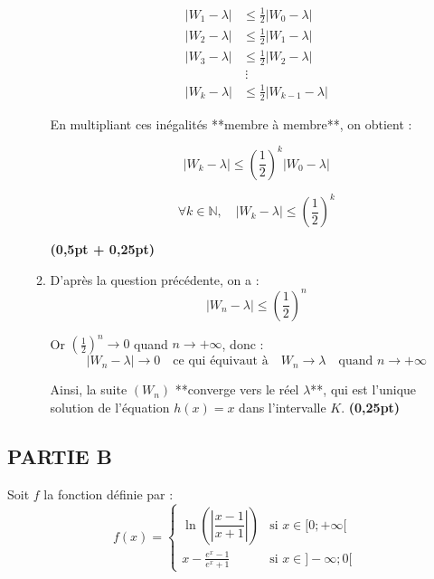 \documentclass[12pt,a4paper]{article}
\begin{document}
\begin{enumerate}
\begin{enumerate}
        \begin{equation*}
            \begin{aligned}
                |W_{1} - \lambda| & \leq \frac{1}{2} |W_0 - \lambda|     \\
                |W_{2} - \lambda| & \leq \frac{1}{2} |W_1 - \lambda|     \\
                |W_{3} - \lambda| & \leq \frac{1}{2} |W_2 - \lambda|     \\
                                  & \ \vdots                             \\
                |W_k - \lambda|   & \leq \frac{1}{2} |W_{k-1} - \lambda|
            \end{aligned}
        \end{equation*}

        En multipliant ces inégalités **membre à membre**, on obtient :

        \begin{equation*}
            |W_k - \lambda| \leq \left( \frac{1}{2} \right)^k |W_0 - \lambda|
        \end{equation*}

        \[
            \forall k \in \mathbb{N},\quad |W_k - \lambda| \leq \left( \frac{1}{2} \right)^k
        \]

        \hfill \textbf{(0,5pt + 0,25pt)}
    \item D’après la question précédente, on a :
        \[
            |W_n - \lambda| \leq \left( \frac{1}{2} \right)^n
        \]

        Or \( \left( \frac{1}{2} \right)^n \to 0 \) quand \( n \to +\infty \), donc :
        \[
            |W_n - \lambda| \to 0
            \quad \text{ce qui équivaut à} \quad
            W_n \to \lambda
            \quad \text{quand } n \to +\infty
        \]

        Ainsi, la suite \( (W_n) \) **converge vers le réel \( \lambda \)**, qui est l’unique solution de l’équation \( h(x) = x \) dans l’intervalle \( K \). \hfill \textbf{(0,25pt)}
    \end{enumerate}

\end{enumerate}

\subsection*{PARTIE B}

Soit \( f \) la fonction définie par :
\[
    f(x) =
    \begin{cases}
        \ln\left( \left| \dfrac{x - 1}{x + 1} \right| \right) & \text{si } x \in [0 ; +\infty[ \\
        \displaystyle x-\frac{e^x - 1}{e^x + 1}               & \text{si } x \in ]-\infty ; 0[
    \end{cases}
\]
\end{document}
